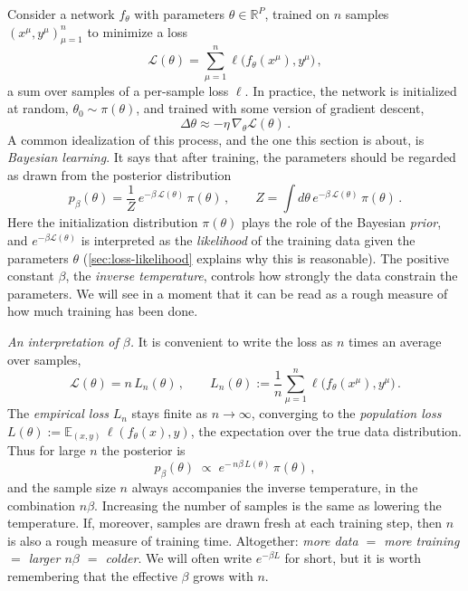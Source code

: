 \documentclass[11pt]{article}
\newcommand{\R}{\mathbb{R}}
\newcommand{\E}{\mathbb{E}}
\newcommand{\CL}{{\mathcal L}}
\begin{document}
Consider a network $f_\theta$ with parameters $\theta\in\R^P$, trained on $n$ samples $(x^\mu,y^\mu)_{\mu=1}^n$ to minimize a loss
%
\begin{equation}
    \CL(\theta) = \sum_{\mu=1}^n \ell\big(f_\theta(x^\mu),y^\mu\big)\,, \label{sec2-loss}
\end{equation}
%
a sum over samples of a per-sample loss $\ell$. In practice, the network is initialized at random, $\theta_0\sim\pi(\theta)$, and trained with some version of gradient descent,
%
\begin{equation}
    \Delta\theta \approx -\eta\,\nabla_\theta\CL(\theta)\,.
\end{equation}
%
A common idealization of this process, and the one this section is about, is \emph{Bayesian learning}. It says that after training, the parameters should be regarded as drawn from the posterior distribution
%
\begin{equation}
    p_\beta(\theta) = \frac{1}{Z}\,e^{-\beta\,\CL(\theta)}\,\pi(\theta)\,,\qquad Z = \int d\theta\, e^{-\beta\,\CL(\theta)}\,\pi(\theta)\,. \label{Bayes-P}
\end{equation}
%
Here the initialization distribution $\pi(\theta)$ plays the role of the Bayesian \emph{prior}, and $e^{-\beta\CL(\theta)}$ is interpreted as the \emph{likelihood} of the training data given the parameters $\theta$ (\cref{sec:loss-likelihood} explains why this is reasonable). The positive constant $\beta$, the \emph{inverse temperature}, controls how strongly the data constrain the parameters. We will see in a moment that it can be read as a rough measure of how much training has been done.

\emph{An interpretation of $\beta$.} It is convenient to write the loss as $n$ times an average over samples,
%
\begin{equation}
    \CL(\theta) = n\,L_n(\theta)\,,\qquad L_n(\theta) := \frac{1}{n}\sum_{\mu=1}^n\ell\big(f_\theta(x^\mu),y^\mu\big)\,.
\end{equation}
%
The \emph{empirical loss} $L_n$ stays finite as $n\to\infty$, converging to the \emph{population loss} $L(\theta) := \E_{(x,y)}\,\ell(f_\theta(x),y)$, the expectation over the true data distribution. Thus for large $n$ the posterior is
%
\begin{equation}
    p_\beta(\theta) \;\propto\; e^{-\,n\beta\,L(\theta)}\,\pi(\theta)\,, \label{Bayes-nbeta}
\end{equation}
%
and the sample size $n$ always accompanies the inverse temperature, in the combination $n\beta$. Increasing the number of samples is the same as lowering the temperature. If, moreover, samples are drawn fresh at each training step, then $n$ is also a rough measure of training time. Altogether: \emph{more data $=$ more training $=$ larger $n\beta$ $=$ colder}. We will often write $e^{-\beta L}$ for short, but it is worth remembering that the effective $\beta$ grows with $n$.
\end{document}

